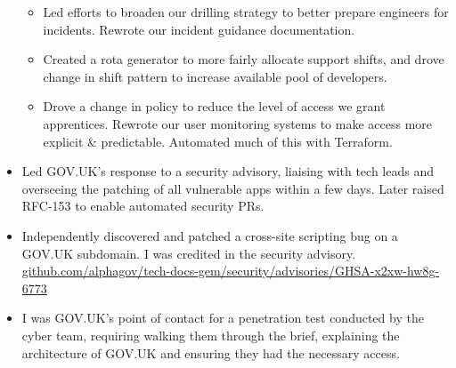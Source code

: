\documentclass[10pt,a4paper,ragged2e,withhyper]{altacv}
\begin{document}
\begin{paracol}{2}
\begin{itemize}
    \vspace{\nestedlistspacer}
    \begin{itemize}[label=$\triangleright$]
        \item Led efforts to broaden our drilling strategy to better prepare engineers for incidents. Rewrote our incident guidance documentation.
        \item Created a rota generator to more fairly allocate support shifts, and drove change in shift pattern to increase available pool of developers.
        \item Drove a change in policy to reduce the level of access we grant apprentices. Rewrote our user monitoring systems to make access more explicit \& predictable. Automated much of this with Terraform.
    \end{itemize}

    \item Led GOV.UK's response to a security advisory, liaising with tech leads and overseeing the patching of all vulnerable apps within a few days. Later raised RFC-153 to enable automated security PRs.

    \item Independently discovered and patched a cross-site scripting bug on a GOV.UK subdomain. I was credited in the security advisory. \href{https://github.com/alphagov/tech-docs-gem/security/advisories/GHSA-x2xw-hw8g-6773}{\url{github.com/alphagov/tech-docs-gem/security/advisories/GHSA-x2xw-hw8g-6773}}

    \item I was GOV.UK's point of contact for a penetration test conducted by the cyber team, requiring walking them through the brief, explaining the architecture of GOV.UK and ensuring they had the necessary access.
\end{itemize}

\divider


\end{paracol}
\end{document}
